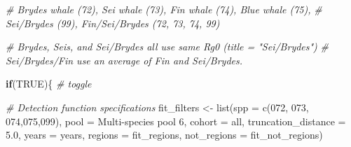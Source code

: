 \documentclass[
]{book}
\newenvironment{Shaded}{\begin{snugshade}}{\end{snugshade}}
\newcommand{\AttributeTok}[1]{\textcolor[rgb]{0.77,0.63,0.00}{#1}}
\newcommand{\CommentTok}[1]{\textcolor[rgb]{0.56,0.35,0.01}{\textit{#1}}}
\newcommand{\ConstantTok}[1]{\textcolor[rgb]{0.00,0.00,0.00}{#1}}
\newcommand{\ControlFlowTok}[1]{\textcolor[rgb]{0.13,0.29,0.53}{\textbf{#1}}}
\newcommand{\FloatTok}[1]{\textcolor[rgb]{0.00,0.00,0.81}{#1}}
\newcommand{\FunctionTok}[1]{\textcolor[rgb]{0.00,0.00,0.00}{#1}}
\newcommand{\NormalTok}[1]{#1}
\newcommand{\OtherTok}[1]{\textcolor[rgb]{0.56,0.35,0.01}{#1}}
\newcommand{\StringTok}[1]{\textcolor[rgb]{0.31,0.60,0.02}{#1}}
\begin{document}
\begin{Shaded}
\begin{Highlighting}[]
\CommentTok{\# Bryde\textquotesingle{}s whale (72), Sei whale (73), Fin whale (74), Blue whale (75),}
\CommentTok{\# Sei/Bryde\textquotesingle{}s (99), Fin/Sei/Bryde\textquotesingle{}s (72, 73, 74, 99)}

\CommentTok{\# Bryde\textquotesingle{}s, Sei\textquotesingle{}s, and Sei/Bryde\textquotesingle{}s all use same Rg0 (title = "Sei/Bryde\textquotesingle{}s")}
\CommentTok{\# Sei/Bryde\textquotesingle{}s/Fin use an average of Fin and Sei/Bryde\textquotesingle{}s.}

\ControlFlowTok{if}\NormalTok{(}\ConstantTok{TRUE}\NormalTok{)\{ }\CommentTok{\# toggle}

  \CommentTok{\# Detection function specifications}
\NormalTok{  fit\_filters }\OtherTok{\textless{}{-}}
    \FunctionTok{list}\NormalTok{(}\AttributeTok{spp =} \FunctionTok{c}\NormalTok{(}\StringTok{\textquotesingle{}072\textquotesingle{}}\NormalTok{, }\StringTok{\textquotesingle{}073\textquotesingle{}}\NormalTok{, }\StringTok{\textquotesingle{}074\textquotesingle{}}\NormalTok{,}\StringTok{\textquotesingle{}075\textquotesingle{}}\NormalTok{,}\StringTok{\textquotesingle{}099\textquotesingle{}}\NormalTok{),}
         \AttributeTok{pool =} \StringTok{\textquotesingle{}Multi{-}species pool 6\textquotesingle{}}\NormalTok{,}
         \AttributeTok{cohort =} \StringTok{\textquotesingle{}all\textquotesingle{}}\NormalTok{,}
         \AttributeTok{truncation\_distance =} \FloatTok{5.0}\NormalTok{,}
         \AttributeTok{years =}\NormalTok{ years,}
         \AttributeTok{regions =}\NormalTok{ fit\_regions,}
         \AttributeTok{not\_regions =}\NormalTok{ fit\_not\_regions)}


\end{Highlighting}
\end{Shaded}
\end{document}
